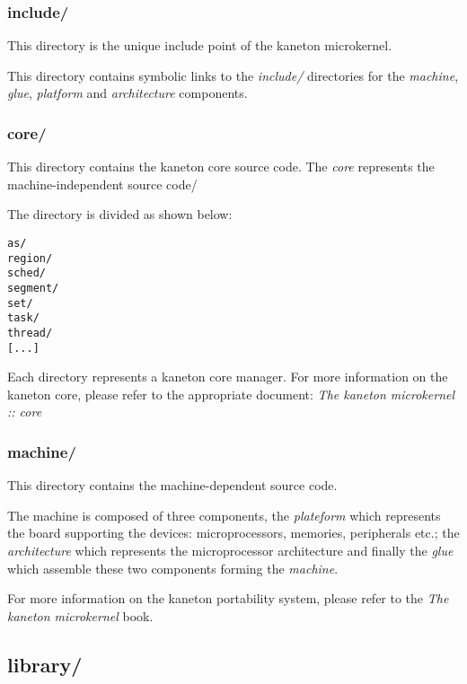 \subsubsection*{include/}

This directory is the unique include point of the kaneton microkernel.

This directory contains symbolic links to the \textit{include/} directories
for the \textit{machine}, \textit{glue}, \textit{platform} and
\textit{architecture} components.


\subsubsection*{core/}

This directory contains the kaneton core source code. The \textit{core}
represents the machine-independent source code/

The directory is divided as shown below:

\begin{verbatim}
as/
region/
sched/
segment/
set/
task/
thread/
[...]
\end{verbatim}

Each directory represents a kaneton core manager. For more information on
the kaneton core, please refer to the appropriate document:
\textit{The kaneton microkernel :: core}


\subsubsection*{machine/}

This directory contains the machine-dependent source code.

The machine is composed of three components, the \textit{plateform} which
represents the board supporting the devices: microprocessors, memories,
peripherals etc.; the \textit{architecture} which represents the microprocessor
architecture and finally the \textit{glue} which assemble these two
components forming the \textit{machine}.

For more information on the kaneton portability system, please refer to the
\textit{The kaneton microkernel} book.

%
%

\subsection*{library/}


